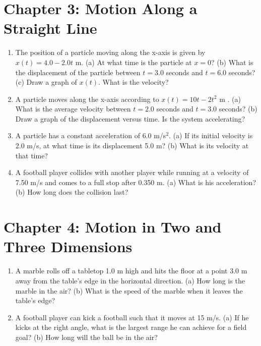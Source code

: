 \documentclass[10pt]{article}
\begin{document}
\section{Chapter 3: Motion Along a Straight Line}

\begin{enumerate}
\item The position of a particle moving along the x-axis is given by $x(t) = 4.0 - 2.0t$ m. (a) At what time is the particle at $x=0$? (b) What is the displacement of the particle between $t=3.0$ seconds and $t=6.0$ seconds?  (c) Draw a graph of $x(t)$.  What is the velocity? \\ \vspace{2cm}
\item A particle moves along the x-axis according to $x(t) = 10t - 2t^2$ m . (a) What is the average velocity between $t=2.0$ seconds and $t=3.0$ seconds? (b) Draw a graph of the displacement versus time.  Is the system accelerating?  \\ \vspace{3cm}
\item A particle has a constant acceleration of $6.0$ m/s$^2$.  (a) If its initial velocity is 2.0 m/s, at what time is its displacement 5.0 m? (b) What is its velocity at that time? \\ \vspace{3cm}
\item A football player collides with another player while running at a velocity of 7.50 m/s and comes to a full stop after 0.350 m. (a) What is his acceleration? (b) How long does
the collision last? \\ \vspace{4cm}
\end{enumerate}

\section{Chapter 4: Motion in Two and Three Dimensions}

\begin{enumerate}
\item A marble rolls off a tabletop 1.0 m high and hits the floor at a point 3.0 m away from the table’s edge in the horizontal direction. (a) How long is the marble in the air? (b) What is the speed of the marble when it leaves the table’s edge? \\ \vspace{4cm}
\item A football player can kick a football such that it moves at 15 m/s.  (a) If he kicks at the right angle, what is the largest range he can achieve for a field goal? (b) How long will the ball be in the air?
\end{enumerate}
\end{document}

